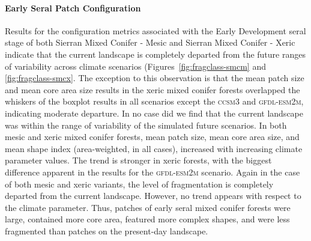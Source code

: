 \paragraph{Early Seral Patch Configuration}
Results for the configuration metrics associated with the Early Development seral stage of both Sierran Mixed Conifer - Mesic and Sierran Mixed Conifer - Xeric indicate that the current landscape is completely departed from the future ranges of variability across climate scenarios (Figures~\ref{fig:fragclass-smcm} and \ref{fig:fragclass-smcx}. The exception to this observation is that the mean patch size and mean core area size results in the xeric mixed conifer forests overlapped the whiskers of the boxplot results in all scenarios except the \textsc{ccsm3} and \textsc{gfdl-esm2m}, indicating moderate departure. In no case did we find that the current landscape was within the range of variability of the simulated future scenarios. In both mesic and xeric mixed conifer forests, mean patch size, mean core area size, and mean shape index (area-weighted, in all cases), increased with increasing climate parameter values. The trend is stronger in xeric forests, with the biggest difference apparent in the results for the \textsc{gfdl-esm2m} scenario. Again in the case of both mesic and xeric variants, the level of fragmentation is completely departed from the current landscape. However, no trend appears with respect to the climate parameter. Thus, patches of early seral mixed conifer forests were large, contained more core area, featured more complex shapes, and were less fragmented than patches on the present-day landscape.



